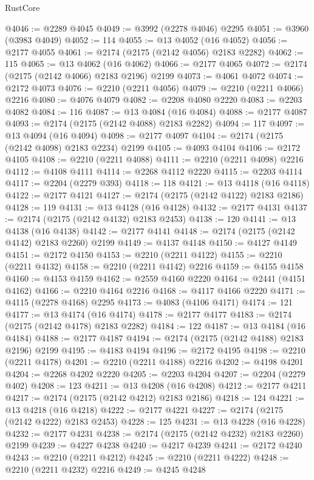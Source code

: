 \begin{lexlean}{RustCore}
\begin{coremodule}
@4046 := @2289 @4045
@4049 := @3992 (@2278 @4046) @2295
@4051 := @3960 (@3983 @4049)
@4052 := 114
@4055 := @13 @4052 (@16 @4052)
@4056 := @2177 @4055
@4061 := @2174 (@2175 (@2142 @4056) @2183 @2282)
@4062 := 115
@4065 := @13 @4062 (@16 @4062)
@4066 := @2177 @4065
@4072 := @2174 (@2175 (@2142 @4066) @2183 @2196) @2199
@4073 := @4061 @4072
@4074 := @2172 @4073
@4076 := @2210 (@2211 @4056)
@4079 := @2210 (@2211 @4066) @2216
@4080 := @4076 @4079
@4082 := @2208 @4080 @2220
@4083 := @2203 @4082
@4084 := 116
@4087 := @13 @4084 (@16 @4084)
@4088 := @2177 @4087
@4093 := @2174 (@2175 (@2142 @4088) @2183 @2282)
@4094 := 117
@4097 := @13 @4094 (@16 @4094)
@4098 := @2177 @4097
@4104 := @2174 (@2175 (@2142 @4098) @2183 @2234) @2199
@4105 := @4093 @4104
@4106 := @2172 @4105
@4108 := @2210 (@2211 @4088)
@4111 := @2210 (@2211 @4098) @2216
@4112 := @4108 @4111
@4114 := @2268 @4112 @2220
@4115 := @2203 @4114
@4117 := @2204 (@2279 @393)
@4118 := 118
@4121 := @13 @4118 (@16 @4118)
@4122 := @2177 @4121
@4127 := @2174 (@2175 (@2142 @4122) @2183 @2186)
@4128 := 119
@4131 := @13 @4128 (@16 @4128)
@4132 := @2177 @4131
@4137 := @2174 (@2175 (@2142 @4132) @2183 @2453)
@4138 := 120
@4141 := @13 @4138 (@16 @4138)
@4142 := @2177 @4141
@4148 := @2174 (@2175 (@2142 @4142) @2183 @2260) @2199
@4149 := @4137 @4148
@4150 := @4127 @4149
@4151 := @2172 @4150
@4153 := @2210 (@2211 @4122)
@4155 := @2210 (@2211 @4132)
@4158 := @2210 (@2211 @4142) @2216
@4159 := @4155 @4158
@4160 := @4153 @4159
@4162 := @2559 @4160 @2220
@4164 := @2441 (@4151 @4162)
@4166 := @2210 @4164 @2216
@4168 := @4117 @4166 @2220
@4171 := @4115 (@2278 @4168) @2295
@4173 := @4083 (@4106 @4171)
@4174 := 121
@4177 := @13 @4174 (@16 @4174)
@4178 := @2177 @4177
@4183 := @2174 (@2175 (@2142 @4178) @2183 @2282)
@4184 := 122
@4187 := @13 @4184 (@16 @4184)
@4188 := @2177 @4187
@4194 := @2174 (@2175 (@2142 @4188) @2183 @2196) @2199
@4195 := @4183 @4194
@4196 := @2172 @4195
@4198 := @2210 (@2211 @4178)
@4201 := @2210 (@2211 @4188) @2216
@4202 := @4198 @4201
@4204 := @2268 @4202 @2220
@4205 := @2203 @4204
@4207 := @2204 (@2279 @402)
@4208 := 123
@4211 := @13 @4208 (@16 @4208)
@4212 := @2177 @4211
@4217 := @2174 (@2175 (@2142 @4212) @2183 @2186)
@4218 := 124
@4221 := @13 @4218 (@16 @4218)
@4222 := @2177 @4221
@4227 := @2174 (@2175 (@2142 @4222) @2183 @2453)
@4228 := 125
@4231 := @13 @4228 (@16 @4228)
@4232 := @2177 @4231
@4238 := @2174 (@2175 (@2142 @4232) @2183 @2260) @2199
@4239 := @4227 @4238
@4240 := @4217 @4239
@4241 := @2172 @4240
@4243 := @2210 (@2211 @4212)
@4245 := @2210 (@2211 @4222)
@4248 := @2210 (@2211 @4232) @2216
@4249 := @4245 @4248

\end{coremodule}
\end{lexlean}
